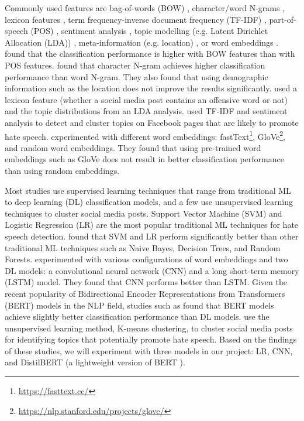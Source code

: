 %
Commonly used features are bag-of-words (BOW) \citep{greevy2004classifying}, character/word N-grams \citep{waseem2016hateful}, lexicon features \citep{xiang2012detecting},  term frequency-inverse document frequency (TF-IDF) \citep{badjatiya2017deep, davidson2017automated, rodriguez2019automatic}, part-of-speech (POS) \citep{greevy2004classifying}, sentiment analysis \citep{rodriguez2019automatic}, topic modelling (e.g. Latent Dirichlet Allocation (LDA)) \citep{xiang2012detecting}, meta-information (e.g. location) \citep{waseem2016hateful}, or word embeddings \citep{badjatiya2017deep, agrawal2018deep}.
%
\citet{greevy2004classifying} found that the classification performance is higher with BOW features than with POS features.
%
\citet{waseem2016hateful} found that character N-gram achieves higher classification performance than word N-gram.
%
They also found that using demographic information such as the location does not improve the results significantly.
%
\citet{xiang2012detecting} used a lexicon feature (whether a social media post contains an offensive word or not) and the topic distributions from an LDA analysis.
%
\citet{rodriguez2019automatic} used TF-IDF and sentiment analysis to detect and cluster topics on Facebook pages that are likely to promote hate speech.
%
\citet{badjatiya2017deep} experimented with different word embeddings: fastText\footnote{\url{https://fasttext.cc/}}, GloVe\footnote{\url{https://nlp.stanford.edu/projects/glove/}}, and random word embeddings.
%
They found that using pre-trained word embeddings such as GloVe does not result in better classification performance than using random embeddings.
%

Most studies use supervised learning techniques that range from traditional ML to deep learning (DL) classification models, and a few use unsupervised learning techniques to cluster social media posts.
%
Support Vector Machine (SVM) \citep{greevy2004classifying, xiang2012detecting,davidson2017automated} and Logistic Regression (LR) \citep{waseem2016hateful, davidson2017automated} are the most popular traditional ML techniques for hate speech detection.
%
\citet{davidson2017automated} found that SVM and LR perform significantly better than other traditional ML techniques such as Naive Bayes, Decision Trees, and Random Forests.
%
\citet{badjatiya2017deep} experimented with various configurations of word embeddings and two DL models: a convolutional neural network (CNN) and a long short-term memory (LSTM) model.
%
They found that CNN performs better than LSTM.
%
Given the recent popularity of Bidirectional Encoder Representations from Transformers (BERT) models \citep{devlin2018bert} in the NLP field, studies such as \citet{alatawi2021detecting} found that BERT models achieve slightly better classification performance than DL models.
%
\citet{rodriguez2019automatic} use the unsupervised learning method, K-means clustering, to cluster social media posts for identifying topics that potentially promote hate speech.
%
Based on the findings of these studies, we will experiment with three models in our project: LR, CNN, and DistilBERT (a lightweight version of BERT \citep{sanh2019distilbert}).


